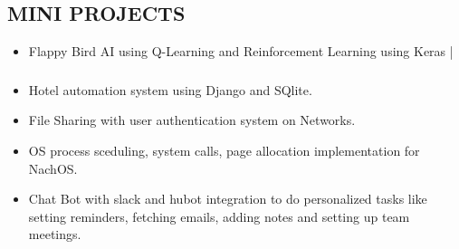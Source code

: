 \documentclass[letterpaper]{twentysecondcv} %
\begin{document}
\subsection{MINI PROJECTS}
\begin{itemize}
\item Flappy Bird AI using Q-Learning and Reinforcement Learning using Keras | \subsubsection{}
\item Hotel automation system using Django and SQlite.
\item File Sharing with user authentication system on Networks.
\item OS process sceduling, system calls, page allocation implementation for NachOS.
\item Chat Bot with slack and hubot integration to do personalized tasks like setting reminders, fetching emails, adding notes and setting up team meetings.
\end{itemize}











\end{document}
